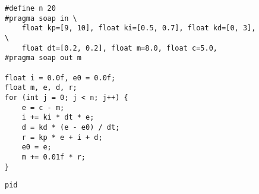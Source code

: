 \begin{figure}[ht]
\begin{lstlisting}
#define n 20
#pragma soap in \
    float kp=[9, 10], float ki=[0.5, 0.7], float kd=[0, 3], \
    float dt=[0.2, 0.2], float m=8.0, float c=5.0,
#pragma soap out m

float i = 0.0f, e0 = 0.0f;
float m, e, d, r;
for (int j = 0; j < n; j++) {
    e = c - m;
    i += ki * dt * e;
    d = kd * (e - e0) / dt;
    r = kp * e + i + d;
    e0 = e;
    m += 0.01f * r;
}
\end{lstlisting}
\caption{\texttt{pid}}
\end{figure}
